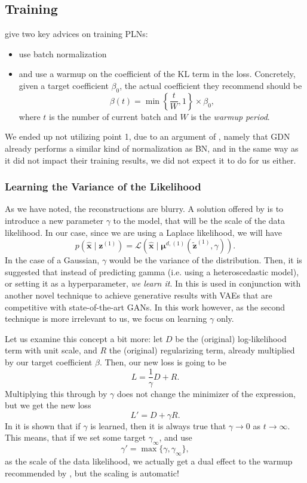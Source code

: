 \documentclass{article}
\renewcommand{\vec}[1]{\mathbf{#1}}
\newcommand{\Laplace}[1]{\mathcal{L}\left( #1 \right)}
\newcommand{\MU}{\boldsymbol\mu}
\begin{document}
\subsection{Training}
\par \cite{sonderby2016train} give two key advices on training PLNs:
\begin{itemize}
\item use batch normalization \cite{ioffe2015batch}
\item and use a warmup on the coefficient of the KL term in the loss.
  Concretely, given a target coefficient $\beta_0$, the actual coefficient they
  recommend should be
  \[
    \beta(t) = \min\left\{ \frac{t}{W}, 1 \right\} \times \beta_0,
  \]
  where $t$ is the number of current batch and $W$ is the \textit{warmup period}.
\end{itemize} 
We ended up not utilizing point 1, due to an argument of
\cite{balle2018variational}, namely that GDN already performs a similar kind of
normalization as BN, and in the same way as it did not impact their training
results, we did not expect it to do for us either.
\subsubsection{Learning the Variance of the Likelihood}
\par
As we have noted, the reconstructions are blurry.
A solution offered by \cite{dai2019diagnosing} is to introduce a new parameter
$\gamma$ to the model, that will be the scale of the data likelihood. In our
case, since we are using a Laplace likelihood, we will have
\[
  p(\vec{\hat{x}} \mid \vec{z}^{(1)}) = \Laplace{\vec{\hat{x}} \mid \MU^{d,
      (1)}(\vec{\tilde{z}}^{(1)}, \gamma)}.
\]
In the case of a Gaussian, $\gamma$ would be the variance of the distribution.
Then, it is suggested that instead of predicting gamma (i.e. using a
heteroscedastic model), or setting it as a hyperparameter, \textit{we learn it}.
In \cite{dai2019diagnosing} this is used in conjunction with another novel
technique to achieve generative results with VAEs that are competitive with
state-of-the-art GANs. In this work however, as the second technique is more
irrelevant to us, we focus on learning $\gamma$ only.
\par
Let us examine this concept a bit more: let $D$ be the (original) log-likelihood
term with unit scale, and $R$ the (original) regularizing term, already
multiplied by our target coefficient $\beta$. Then, our new loss is going to be
\[
  L = \frac{1}{\gamma}D + R.
\]
Multiplying this through by $\gamma$ does not change the minimizer of the
expression, but we get the new loss
\[
  L' = D + \gamma R.
\]
In \cite{dai2019diagnosing} it is shown that if $\gamma$ is learned, then it is
always true that $\gamma \rightarrow 0$ as $t \rightarrow \infty$. This means,
that if we set some target $\gamma_\infty$, and use
\[
  \gamma' = \max\{ \gamma, \gamma_\infty \},
\]
as the scale of the data likelihood, we actually get a dual effect to the warmup
recommended by \cite{sonderby2016train}, but the scaling is automatic!
\end{document}
